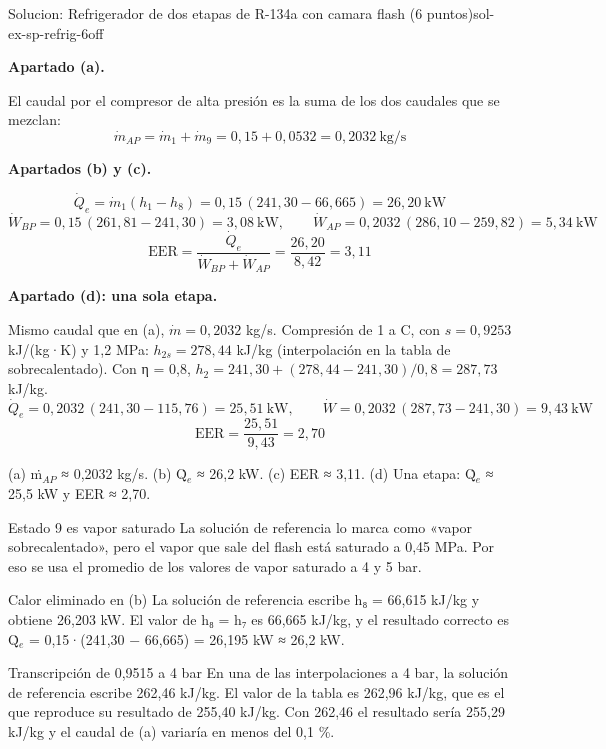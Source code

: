 \documentclass[11pt,a4paper]{article}
\begin{document}
\begin{ocg}{Solucion: Refrigerador de dos etapas de R-134a con camara flash (6 puntos)}{sol-ex-sp-refrig-6}{off}
\par\medskip\noindent\textbf{Apartado (a).}\par
El caudal por el compresor de alta presión es la suma de los dos caudales que se mezclan:  \[\dot m_{AP} = \dot m_1 + \dot m_9 = 0{,}15 + 0{,}0532 = 0{,}2032\ \text{kg/s}\]

\par\medskip\noindent\textbf{Apartados (b) y (c).}\par
\[\dot Q_e = \dot m_1 (h_1 - h_8) = 0{,}15\,(241{,}30 - 66{,}665) = 26{,}20\ \text{kW}\]   \[\dot W_{BP} = 0{,}15\,(261{,}81 - 241{,}30) = 3{,}08\ \text{kW},\qquad \dot W_{AP} = 0{,}2032\,(286{,}10 - 259{,}82) = 5{,}34\ \text{kW}\]   \[\mathrm{EER} = \frac{\dot Q_e}{\dot W_{BP} + \dot W_{AP}} = \frac{26{,}20}{8{,}42} = 3{,}11\]

\par\medskip\noindent\textbf{Apartado (d): una sola etapa.}\par
Mismo caudal que en (a),  $\dot m = 0{,}2032$  kg/s. Compresión de 1 a C, con  $s = 0{,}9253$  kJ/(kg·K) y 1,2 MPa:  $h_{2s} = 278{,}44$  kJ/kg (interpolación en la tabla de sobrecalentado). Con η = 0,8,  $h_2 = 241{,}30 + (278{,}44 - 241{,}30)/0{,}8 = 287{,}73$  kJ/kg.  \[\dot Q_e = 0{,}2032\,(241{,}30 - 115{,}76) = 25{,}51\ \text{kW},\qquad \dot W = 0{,}2032\,(287{,}73 - 241{,}30) = 9{,}43\ \text{kW}\]   \[\mathrm{EER} = \frac{25{,}51}{9{,}43} = 2{,}70\]

\begin{resbox}
(a) ṁ$_{AP}$ ≈ 0,2032 kg/s. (b) Q̇$_{e}$ ≈ 26,2 kW. (c) EER ≈ 3,11. (d) Una etapa: Q̇$_{e}$ ≈ 25,5 kW y EER ≈ 2,70.
\end{resbox}

\begin{ojobox}{Estado 9 es vapor saturado}
La solución de referencia lo marca como «vapor sobrecalentado», pero el vapor que sale del flash está saturado a 0,45 MPa. Por eso se usa el promedio de los valores de vapor saturado a 4 y 5 bar.
\end{ojobox}

\begin{ojobox}{Calor eliminado en (b)}
La solución de referencia escribe h₈ = 66,615 kJ/kg y obtiene 26,203 kW. El valor de h₈ = h₇ es 66,665 kJ/kg, y el resultado correcto es Q̇$_{e}$ = 0,15·(241,30 − 66,665) = 26,195 kW ≈ 26,2 kW.
\end{ojobox}

\begin{ojobox}{Transcripción de 0,9515 a 4 bar}
En una de las interpolaciones a 4 bar, la solución de referencia escribe 262,46 kJ/kg. El valor de la tabla es 262,96 kJ/kg, que es el que reproduce su resultado de 255,40 kJ/kg. Con 262,46 el resultado sería 255,29 kJ/kg y el caudal de (a) variaría en menos del 0,1 \%.
\end{ojobox}

\hspace{0pt}\end{ocg}
\end{document}
